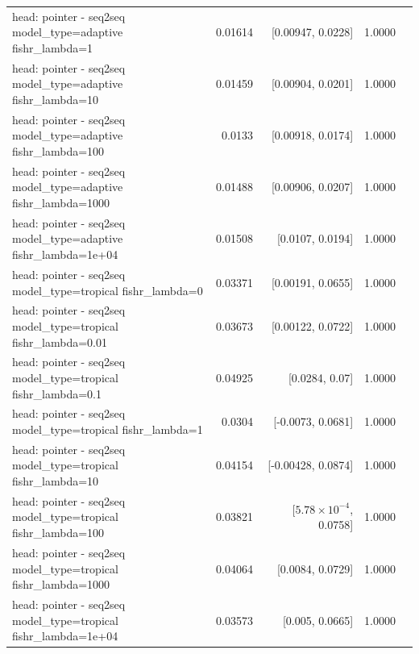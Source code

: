 \documentclass[10pt]{article}
\makeatletter
\newcommand{\stackcell}[1]{\begin{tabular}[t]{@{}l@{}}#1\end{tabular}}
\makeatother
\begin{document}
{\begin{longtable}{lrrrl}
\stackcell{head: pointer - seq2seq\\\footnotesize model\_type=adaptive fishr\_lambda=1 } & 0.01614 & [0.00947, 0.0228] & 1.0000 & \\
\stackcell{head: pointer - seq2seq\\\footnotesize model\_type=adaptive fishr\_lambda=10 } & 0.01459 & [0.00904, 0.0201] & 1.0000 & \\
\stackcell{head: pointer - seq2seq\\\footnotesize model\_type=adaptive fishr\_lambda=100 } & 0.0133 & [0.00918, 0.0174] & 1.0000 & \\
\stackcell{head: pointer - seq2seq\\\footnotesize model\_type=adaptive fishr\_lambda=1000 } & 0.01488 & [0.00906, 0.0207] & 1.0000 & \\
\stackcell{head: pointer - seq2seq\\\footnotesize model\_type=adaptive fishr\_lambda=1e+04 } & 0.01508 & [0.0107, 0.0194] & 1.0000 & \\
\stackcell{head: pointer - seq2seq\\\footnotesize model\_type=tropical fishr\_lambda=0 } & 0.03371 & [0.00191, 0.0655] & 1.0000 & \\
\stackcell{head: pointer - seq2seq\\\footnotesize model\_type=tropical fishr\_lambda=0.01 } & 0.03673 & [0.00122, 0.0722] & 1.0000 & \\
\stackcell{head: pointer - seq2seq\\\footnotesize model\_type=tropical fishr\_lambda=0.1 } & 0.04925 & [0.0284, 0.07] & 1.0000 & \\
\stackcell{head: pointer - seq2seq\\\footnotesize model\_type=tropical fishr\_lambda=1 } & 0.0304 & [-0.0073, 0.0681] & 1.0000 & \\
\stackcell{head: pointer - seq2seq\\\footnotesize model\_type=tropical fishr\_lambda=10 } & 0.04154 & [-0.00428, 0.0874] & 1.0000 & \\
\stackcell{head: pointer - seq2seq\\\footnotesize model\_type=tropical fishr\_lambda=100 } & 0.03821 & [$5.78\times10^{-4}$, 0.0758] & 1.0000 & \\
\stackcell{head: pointer - seq2seq\\\footnotesize model\_type=tropical fishr\_lambda=1000 } & 0.04064 & [0.0084, 0.0729] & 1.0000 & \\
\stackcell{head: pointer - seq2seq\\\footnotesize model\_type=tropical fishr\_lambda=1e+04 } & 0.03573 & [0.005, 0.0665] & 1.0000 & \\

\end{longtable}}
\end{document}
